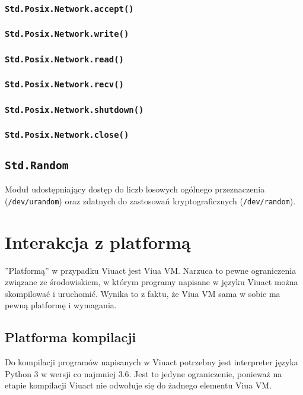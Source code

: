 \documentclass[11pt,oneside,a4paper,titlepage,onecolumn]{article}
\begin{document}
\subsubsection{\texttt{Std.Posix.Network.accept()}}
\subsubsection{\texttt{Std.Posix.Network.write()}}
\subsubsection{\texttt{Std.Posix.Network.read()}}
\subsubsection{\texttt{Std.Posix.Network.recv()}}
\subsubsection{\texttt{Std.Posix.Network.shutdown()}}
\subsubsection{\texttt{Std.Posix.Network.close()}}

\subsection{\texttt{Std.Random}}

Moduł udostępniający dostęp do liczb losowych ogólnego przeznaczenia (\texttt{/dev/urandom}) oraz zdatnych do
zastosowań kryptograficznych (\texttt{/dev/random}).

\newpage
\section{Interakcja z platformą}

''Platformą'' w przypadku Viuact jest Viua VM. Narzuca to pewne ograniczenia związane ze środowiskiem, w
którym programy napisane w języku Viuact można skompilować i uruchomić. Wynika to z faktu, że Viua VM sama w
sobie ma pewną platformę i wymagania.

\subsection{Platforma kompilacji}

Do kompilacji programów napisanych w Viuact potrzebny jest interpreter języka Python 3 w wersji co najmniej
3.6. Jest to jedyne ograniczenie, ponieważ na etapie kompilacji Viuact nie odwołuje się do żadnego elementu
Viua VM.
\end{document}
